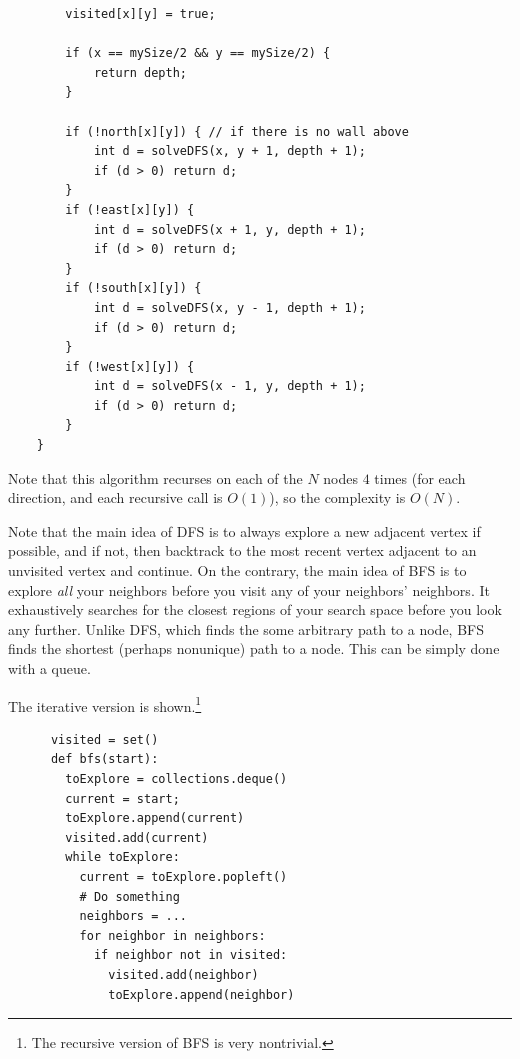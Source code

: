 \begin{example}
\begin{lstlisting}
        visited[x][y] = true; 
        
        if (x == mySize/2 && y == mySize/2) {
            return depth; 
        }
        
        if (!north[x][y]) { // if there is no wall above
            int d = solveDFS(x, y + 1, depth + 1); 
            if (d > 0) return d; 
        }
        if (!east[x][y]) {
            int d = solveDFS(x + 1, y, depth + 1); 
            if (d > 0) return d; 
        }
        if (!south[x][y]) {
            int d = solveDFS(x, y - 1, depth + 1); 
            if (d > 0) return d; 
        }
        if (!west[x][y]) {
            int d = solveDFS(x - 1, y, depth + 1); 
            if (d > 0) return d; 
        }
    }
    \end{lstlisting}
    Note that this algorithm recurses on each of the $N$ nodes $4$ times (for each direction, and each recursive call is $O(1)$), so the complexity is $O(N)$. 
  \end{example}

  Note that the main idea of DFS is to always explore a new adjacent vertex if possible, and if not, then backtrack to the most recent vertex adjacent to an unvisited vertex and continue. On the contrary, the main idea of BFS is to explore \textit{all} your neighbors before you visit any of your neighbors' neighbors. It exhaustively searches for the closest regions of your search space before you look any further. Unlike DFS, which finds the some arbitrary path to a node, BFS finds the shortest (perhaps nonunique) path to a node. This can be simply done with a queue. 

  \begin{definition}[BFS]
    The iterative version is shown.\footnote{The recursive version of BFS is very nontrivial.}
    \begin{lstlisting}
      visited = set() 
      def bfs(start): 
        toExplore = collections.deque() 
        current = start; 
        toExplore.append(current) 
        visited.add(current) 
        while toExplore: 
          current = toExplore.popleft() 
          # Do something 
          neighbors = ... 
          for neighbor in neighbors: 
            if neighbor not in visited: 
              visited.add(neighbor) 
              toExplore.append(neighbor)
    \end{lstlisting}
  \end{definition}

